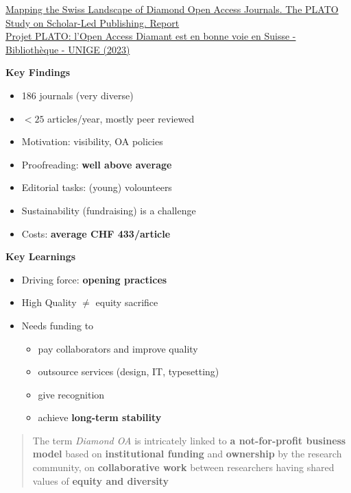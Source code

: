\documentclass[10pt,compress,serif,aspectratio=169]{beamer}
\begin{document}
\begin{frame}[t]%
 \vskip1cm%

{\small
 \href{https://zenodo.org/doi/10.5281/zenodo.7461727}{Mapping the Swiss Landscape of Diamond Open Access Journals. The PLATO Study on Scholar-Led Publishing. Report}\\
 \href{https://www.unige.ch/biblio/fr/actus/projet-plato/}{Projet PLATO: l’Open Access Diamant est en bonne voie en Suisse - Bibliothèque - UNIGE (2023)}
}
 \vfill

\begin{minipage}{.49\textwidth}
   \textbf{Key Findings}
   \begin{itemize}
   \item 186 journals (very diverse)
   \item $< 25$ articles/year, mostly peer reviewed
   \item Motivation: visibility, OA policies
   \item Proofreading: \textbf{well above average}
   \item Editorial tasks: (young) volounteers
   \item Sustainability (fundraising) is a challenge
   \item Costs: \textbf{average CHF 433/article} 
   \end{itemize}
 \end{minipage}
 \begin{minipage}{.49\textwidth}
\pause
   \textbf{Key Learnings}
   \begin{itemize}
   \item Driving force: \textbf{opening practices}
   \item High Quality $\neq$ equity sacrifice
   \item Needs funding to
     \begin{itemize}
     \item pay collaborators and improve quality
     \item outsource services (design, IT, typesetting)
     \item give recognition 
     \item achieve \textbf{long-term stability}
     \end{itemize}
   \end{itemize}

 \end{minipage}
 \vfill
 \pause
 \begin{quote}
   The term \textit{Diamond OA} is intricately linked to \textbf{a not-for-profit business model} based on \textbf{institutional funding} and \textbf{ownership} by the research community, on \textbf{collaborative work} between researchers having shared values of \textbf{equity and diversity}
 \end{quote}

\end{frame}
\end{document}
